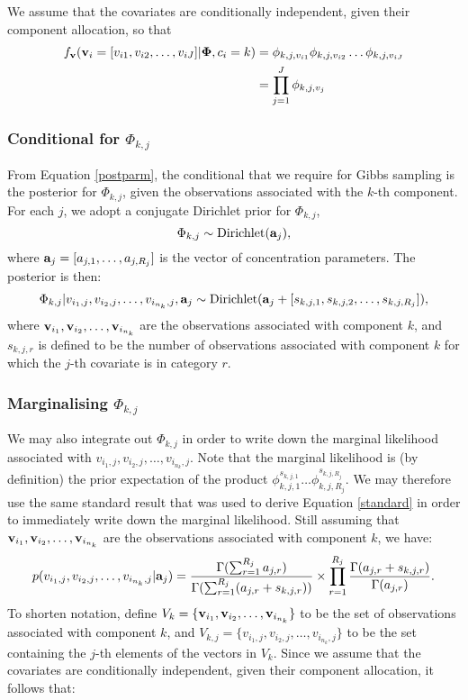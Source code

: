 \documentclass[fleqn,11pt]{wlscirep}
\begin{document}
We assume that the covariates are conditionally independent, given their component allocation, so that 
\begin{align}      
 f_{\bf v}({\bf v}_i = [v_{i1}, v_{i2}, \ldots, v_{iJ}]|\boldsymbol{\Phi}, c_i = k) &= \phi_{k,j,v_{i1}} \phi_{k,j,v_{i2}} \ldots \phi_{k,j,v_{iJ}}\\
 &= \prod_{j = 1}^J  \phi_{k,j,v_j}\label{likeliprod}
\end{align}

\subsubsection{Conditional for $\Phi_{k,j}$}
From Equation \eqref{postparm}, the conditional that we require for Gibbs sampling is the posterior for $\Phi_{k,j}$, given the observations associated with the $k$-th component.  For each $j$, we adopt a conjugate Dirichlet prior for $\Phi_{k,j}$, $$\Phi_{k,j} \sim \mbox{Dirichlet}({\bf a}_j),$$ where ${\bf a}_j = [a_{j,1}, \ldots, a_{j,R_j}]$ is the vector of concentration parameters.
The posterior is then:
\begin{align}
\Phi_{k,j}|{ v}_{i_1,j}, { v}_{i_2,j}, \ldots, { v}_{i_{n_k},j}, {\bf a}_j \sim \mbox{Dirichlet}({\bf a}_j + [s_{k,j,1}, s_{k,j,2}, \ldots, s_{k,j,R_j}]),
\end{align}
where ${\bf v}_{i_1}, {\bf v}_{i_2}, \ldots, {\bf v}_{i_{n_k}}$ are the observations associated with component $k$, and $s_{k,j,r}$ is defined to be the number of observations associated with component $k$ for which the $j$-th covariate is in category $r$.  

\subsubsection{Marginalising $\Phi_{k,j}$}\label{marginphi}
We may also integrate out $\Phi_{k,j}$ in order to write down the marginal likelihood associated with ${ v}_{i_1,j}, { v}_{i_2,j}, \ldots, { v}_{i_{n_k},j}$.  Note that the marginal likelihood is (by definition) the prior expectation of the product $\phi_{k,j,1}^{s_{k,j,1}}\ldots\phi_{k,j,{R_j}}^{s_{k,j,{R_j}}}$.  We may therefore use the same standard result that was used to derive Equation \eqref{standard} in order to immediately write down the marginal likelihood.  Still assuming that ${\bf v}_{i_1}, {\bf v}_{i_2}, \ldots, {\bf v}_{i_{n_k}}$ are the observations associated  with component $k$, we have:
\begin{equation}
p({ v}_{i_1,j}, { v}_{i_2,j}, \ldots, { v}_{i_{n_k},j}| {\bf a}_j) = \frac{\Gamma(\sum_{r=1}^{R_j}a_{j,r} )}{\Gamma(\sum_{r=1}^{R_j}(a_{j,r}+ s_{k,j,r}) )}\times \prod_{r = 1}^{R_j} \frac{\Gamma(a_{j,r} + s_{k,j,r})}{\Gamma(a_{j,r})}.\label{catmarg}
\end{equation}
To shorten notation, define $V_{k} = \{ {\bf v}_{i_1}, {\bf v}_{i_2}, \ldots, {\bf v}_{i_{n_k}} \}$ to be the set of observations associated with component $k$, and $V_{k, j} = \{ { v}_{i_1,j}, { v}_{i_2,j}, \ldots, { v}_{i_{n_k},j} \}$ to be the set containing the $j$-th elements of the vectors in $V_{k}$.  Since we assume that the covariates are conditionally independent, given their component allocation, it follows that:
    
\end{document}
